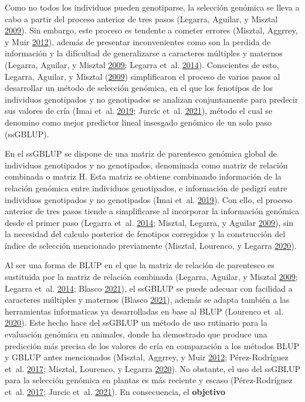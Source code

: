 \documentclass[11pt,spanish,a4paper,oneside,]{book} %
\begin{document}
Como no todos los individuos pueden genotiparse, la selección genómica se lleva a cabo a partir del proceso anterior de tres pasos (Legarra, Aguilar, y Misztal \protect\hyperlink{ref-cite:17}{2009}). Sin embargo, este proceso es tendente a cometer errores (Misztal, Aggrrey, y Muir \protect\hyperlink{ref-cite:14}{2012}), además de presentar inconvenientes como son la perdida de información y la difícultad de generalizarse a caracteres múltiples y maternos (Legarra, Aguilar, y Misztal \protect\hyperlink{ref-cite:17}{2009}; Legarra et~al. \protect\hyperlink{ref-cite:15}{2014}). Conscientes de esto, Legarra, Aguilar, y Misztal (\protect\hyperlink{ref-cite:17}{2009}) simplificaron el proceso de varios pasos al desarrollar un método de selección genómica, en el que los fenotipos de los individuos genotipados y no genotipados se analizan conjuntamente para predecir sus valores de cría (Imai et~al. \protect\hyperlink{ref-cite:20}{2019}; Jurcic et~al. \protect\hyperlink{ref-cite:11}{2021}), método el cual se denomino como mejor predictor lineal insesgado genómico de un solo paso (ssGBLUP).

En el ssGBLUP se dispone de una matriz de parentesco genómica global de individuos genotipados y no genotipados, denominada como matriz de relación combinada o matriz H. Esta matriz se obtiene combinando información de la relación genómica entre individuos genotipados, e información de pedigrí entre individuos genotipados y no genotipados (Imai et~al. \protect\hyperlink{ref-cite:20}{2019}). Con ello, el proceso anterior de tres pasos tiende a simplificarse al incorporar la información genómica desde el primer paso (Legarra et~al. \protect\hyperlink{ref-cite:15}{2014}; Misztal, Legarra, y Aguilar \protect\hyperlink{ref-cite:16}{2009}), sin la necesidad del calculo posterior de fenotipos corregidos y la construcción del índice de selección mencionado previamente (Misztal, Lourenco, y Legarra \protect\hyperlink{ref-cite:18}{2020}).

Al ser una forma de BLUP en el que la matriz de relación de parentesco es sustituida por la matriz de relación combinada (Legarra, Aguilar, y Misztal \protect\hyperlink{ref-cite:17}{2009}; Legarra et~al. \protect\hyperlink{ref-cite:15}{2014}; Blasco \protect\hyperlink{ref-cite:21}{2021}), el ssGBLUP se puede adecuar con facilidad a caracteres múltiples y maternos (Blasco \protect\hyperlink{ref-cite:21}{2021}), además se adapta también a las herramientas informaticas ya desarrolladas en base al BLUP (Lourenco et~al. \protect\hyperlink{ref-cite:22}{2020}). Este hecho hace del ssGBLUP un método de uso rutinario para la evaluación genómica en animales, donde ha demostrado que produce una predicción más precisa de los valores de cría en comparación a los métodos BLUP y GBLUP antes mencionados (Misztal, Aggrrey, y Muir \protect\hyperlink{ref-cite:14}{2012}; Pérez-Rodríguez et~al. \protect\hyperlink{ref-cite:19}{2017}; Misztal, Lourenco, y Legarra \protect\hyperlink{ref-cite:18}{2020}). No obstante, el uso del ssGBLUP para la selección genómica en plantas es más reciente y escaso (Pérez-Rodríguez et~al. \protect\hyperlink{ref-cite:19}{2017}; Jurcic et~al. \protect\hyperlink{ref-cite:11}{2021}). En consecuencia, el \textbf{objetivo}
\end{document}
